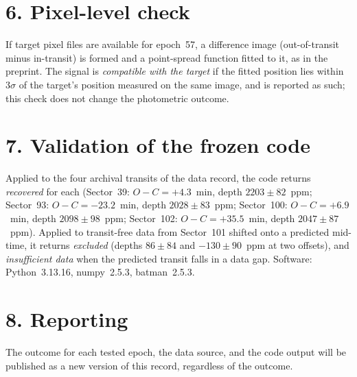 \documentclass[11pt]{article}
\begin{document}
\section*{6. Pixel-level check}
If target pixel files are available for epoch~57, a difference image (out-of-transit minus in-transit) is formed and a point-spread function fitted to it, as in the preprint. The signal is \emph{compatible with the target} if the fitted position lies within $3\sigma$ of the target's position measured on the same image, and is reported as such; this check does not change the photometric outcome.

\section*{7. Validation of the frozen code}
Applied to the four archival transits of the data record, the code returns \emph{recovered} for each (Sector~39: $O-C = +4.3$~min, depth $2203 \pm 82$~ppm; Sector~93: $O-C = -23.2$~min, depth $2028 \pm 83$~ppm; Sector~100: $O-C = +6.9$~min, depth $2098 \pm 98$~ppm; Sector~102: $O-C = +35.5$~min, depth $2047 \pm 87$~ppm). Applied to transit-free data from Sector~101 shifted onto a predicted mid-time, it returns \emph{excluded} (depths $86 \pm 84$ and $-130 \pm 90$~ppm at two offsets), and \emph{insufficient data} when the predicted transit falls in a data gap. Software: Python~3.13.16, numpy~2.5.3, batman~2.5.3.

\section*{8. Reporting}
The outcome for each tested epoch, the data source, and the code output will be published as a new version of this record, regardless of the outcome.
\end{document}
